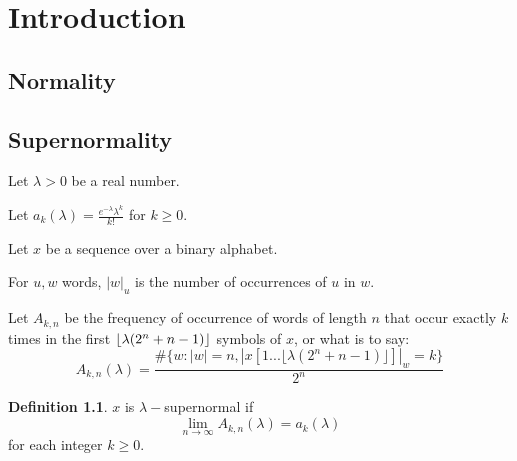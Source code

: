 \documentclass[11pt,a4paper,twoside]{tesis}
\theoremstyle{definition}
\newtheorem{definition}{Definition}[section]
\DeclarePairedDelimiter{\floor}{\lfloor}{\rfloor}
\begin{document}

\def\autor{Lucas Puterman}
\def\tituloTesis{Números Muy Normales}
\def\runtitulo{Números Muy Normales}
\def\runtitle{Very Normal Numbers}
\def\director{Verónica Becher}
\def\codirector{Olivier Carton}
\def\lugar{Buenos Aires, 2019}


\frontmatter
\pagestyle{empty}


\cleardoublepage



\cleardoublepage
\tableofcontents

\mainmatter
\pagestyle{headings}


\chapter{Introduction}
\section{Normality}
\section{Supernormality}

Let $\lambda > 0$ be a real number.

Let $a_k(\lambda) = \frac{e^{-\lambda}\lambda^k}{k!}$ for $k \geq 0$.

Let $x$ be a sequence over a binary alphabet.

For $u,w$ words, $|w|_u$ is the number of occurrences of $u$ in $w$.

Let $A_{k,n}$ be the frequency of occurrence of words of length $n$ that occur exactly $k$ times in the first $\floor{\lambda(2^n+n-1)}$ symbols of $x$, or what is to say:
$$A_{k,n}(\lambda) = \frac{\#\{w: |w| = n  , |x[1...\lfloor\lambda(2^n+n-1)\rfloor]|_w = k\}}{2^n}$$

\begin{definition}
    $x$ is $\lambda-$supernormal if $$\lim_{n\to\infty} A_{k,n}(\lambda) = a_k(\lambda)$$ for each integer $k \geq 0$.
\end{definition}
\end{document}
